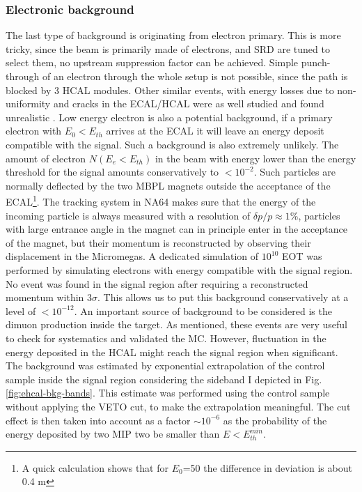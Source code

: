 \subsubsection{Electronic background}
\label{ch3:sec:bkg:inv:elec}

The last type of background is originating from electron primary. This is more tricky, since the beam is primarily made of electrons, and SRD are tuned to select them, no upstream suppression factor can be achieved. Simple punch-through of an electron through the whole setup is not possible, since the path is blocked by 3 HCAL modules. Other similar events, with energy losses due to non-uniformity and cracks in the ECAL/HCAL were as well studied and found unrealistic \cite{Andreas:2013lya}. Low energy electron is also a potential background, if a primary electron with $E_0 < E_{th}$ arrives at the ECAL it will leave an energy deposit compatible with the signal. Such a background is also extremely unlikely. The amount of electron $N(E_e<E_{th})$ in the beam with energy lower than the energy threshold for the signal amounts conservatively to $<10^{-2}$. Such particles are normally deflected by the two MBPL magnets outside the acceptance of the ECAL\footnote{A quick calculation shows that for $E_0$=50 \gev the difference in deviation is about 0.4 \si{\meter}}. The tracking system in NA64 makes sure that the energy of the incoming particle is always measured with a resolution of $\delta p/p \approx 1\%$, particles with large entrance angle in the magnet can in principle enter in the acceptance of the magnet, but their momentum is reconstructed by observing their displacement in the Micromegas. A dedicated simulation of $10^{10}$ EOT was performed by simulating electrons with energy compatible with the signal region. No event was found in the signal region after requiring a reconstructed momentum within 3$\sigma$. This allows us to put this background conservatively at a level of $< 10^{-12}$.
An important source of background to be considered is the dimuon production inside the target. As mentioned, these events are very useful to check for systematics and validated the MC. However, fluctuation in the energy deposited in the HCAL might reach the signal region when significant. The background was estimated by exponential extrapolation of the control sample inside the signal region considering the sideband I depicted in Fig.\ref{fig:ehcal-bkg-bands}. This estimate was performed using the control sample without applying the VETO cut, to make the extrapolation meaningful. The cut effect is then taken into account as a factor $\sim 10^{-6}$ as the probability of the energy deposited by two MIP two be smaller than $E<E^{min}_{th}$.

